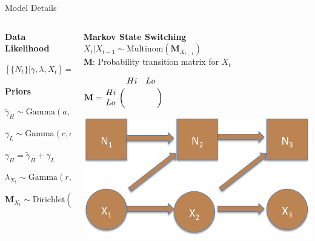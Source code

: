 \documentclass[10pt]{beamer}
\begin{document}
\begin{frame}{Model Details}

\begin{columns}[T]
    \begin{column}{.5\textwidth}
     \begin{block}{}

\textbf{Data Likelihood}

$[\{N_t\} | \gamma, \lambda, X_t ] = \displaystyle\prod_{t = 2}^T {\mathbf{P}^{X_t}_{N_t, N_{t+1}}}$

\vspace{10mm}

\textbf{Priors}

$\tilde{\gamma}_{H} \sim \text{Gamma}(a, b)$

$\gamma_{L} \sim \text{Gamma}(c, d)$

$\gamma_{H} = \tilde{\gamma}_{H} + \gamma_{L}$

$\lambda_{X_t} \sim \text{Gamma}(r, q)$

$\bm{M}_{X_t} \sim \text{Dirichlet}(\underline{\theta}_{X_t})$


\end{block}
    \end{column}
    \begin{column}{.5\textwidth}
    \begin{block}{}
    \textbf{Markov State Switching} \\

$X_t | X_{t-1} \sim \text{Multinom}(\mathbf{M}_{X_{t-1}})$\\

$\mathbf{M}$: Probability transition matrix for $X_t$

$\mathbf{M} = \bordermatrix{
  & Hi & Lo \cr
 Hi & & \cr
 Lo & & 
}$

\vspace{5mm}

 \includegraphics[width=\textwidth]{hiddendoodle.png}
 \end{block}
    \end{column}
  \end{columns}

\end{frame}
\end{document}
